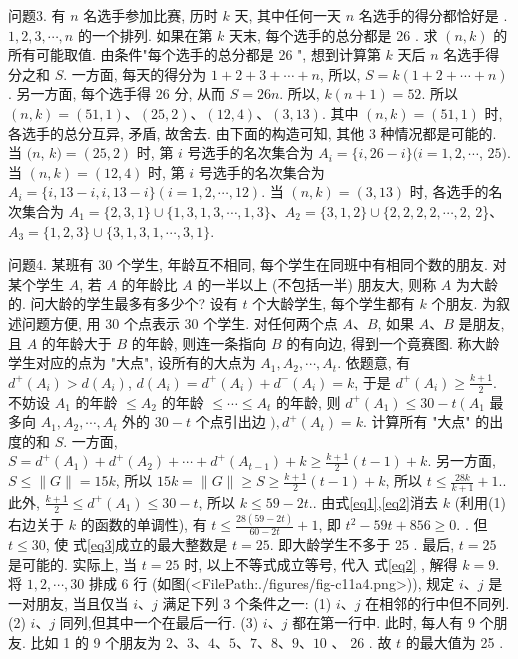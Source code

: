 问题3. 有 $n$ 名选手参加比赛, 历时 $k$ 天, 其中任何一天 $n$ 名选手的得分都恰好是 . $1,2,3, \cdots, n$ 的一个排列.
如果在第 $k$ 天末, 每个选手的总分都是 26 . 求 $(n, k)$ 的所有可能取值.
由条件"每个选手的总分都是 26 ", 想到计算第 $k$ 天后 $n$ 名选手得分之和 $S$. 一方面, 每天的得分为 $1+2+3+\cdots+n$, 所以, $S=k(1+2+\cdots+n)$. 另一方面, 每个选手得 26 分, 从而 $S=26 n$. 所以, $k(n+1)=52$. 所以 $(n, k)= (51,1) 、(25,2) 、(12,4) 、(3,13)$. 其中 $(n, k)=(51,1)$ 时, 各选手的总分互异, 矛盾, 故舍去.
由下面的构造可知, 其他 3 种情况都是可能的.
当 $(n$, $k)=(25,2)$ 时, 第 $i$ 号选手的名次集合为 $A_i=\{i, 26-i\}(i=1,2, \cdots$, $25)$. 当 $(n, k)=(12,4)$ 时, 第 $i$ 号选手的名次集合为 $A_i=\{i, 13-i, i, 13-i\}(i=1,2, \cdots, 12)$. 当 $(n, k)=(3,13)$ 时, 各选手的名次集合为 $A_1= \{2,3,1\} \cup\{1,3,1,3, \cdots, 1,3\} 、 A_2=\{3,1,2\} \cup\{2,2,2,2, \cdots, 2$, 2\}、 $A_3=\{1,2,3\} \cup\{3,1,3,1, \cdots, 3,1\}$.



问题4. 某班有 30 个学生, 年龄互不相同, 每个学生在同班中有相同个数的朋友.
对某个学生 $A$, 若 $A$ 的年龄比 $A$ 的一半以上 (不包括一半) 朋友大, 则称 $A$ 为大龄的.
问大龄的学生最多有多少个?
设有 $t$ 个大龄学生, 每个学生都有 $k$ 个朋友.
为叙述问题方便, 用 30 个点表示 30 个学生.
对任何两个点 $A 、 B$, 如果 $A 、 B$ 是朋友, 且 $A$ 的年龄大于 $B$ 的年龄, 则连一条指向 $B$ 的有向边, 得到一个竟赛图.
称大龄学生对应的点为 "大点", 设所有的大点为 $A_1, A_2, \cdots, A_t$. 依题意, 有 $d^{+}\left(A_i\right)>d\left(A_i\right)$, $d\left(A_i\right)=d^{+}\left(A_i\right)+d^{-}\left(A_i\right)=k$, 于是 $d^{+}\left(A_i\right) \geqslant \frac{k+1}{2}$. 
不妨设 $A_1$ 的年龄 $\leqslant A_2$ 的年龄 $\leqslant \cdots \leqslant A_t$ 的年龄, 则 $d^{+}\left(A_1\right) \leqslant 30-t\left(A_1\right.$ 最多向 $A_1, A_2, \cdots, A_t$ 外的 $30-t$ 个点引出边 $), d^{+}\left(A_t\right)=k$. 计算所有 "大点" 的出度的和 $S$. 
一方面, $S=d^{+}\left(A_1\right)+d^{+}\left(A_2\right)+\cdots+d^{+}\left(A_{t-1}\right)+k \geqslant \frac{k+1}{2}(t-1)+k$. 另一方面, $S \leqslant\|G\|=15 k$, 所以 $15 k=\|G\| \geqslant S \geqslant \frac{k+1}{2}(t-1)+k$, 所以 $t \leqslant \frac{28 k}{k+1}+1 . \label{eq1}$. 
此外, $\frac{k+1}{2} \leqslant d^{+}\left(A_1\right) \leqslant 30-t$, 所以 $k \leqslant 59-2 t . \label{eq2}$. 由式\ref{eq1},\ref{eq2}消去 $k$ (利用(1)右边关于 $k$ 的函数的单调性), 有 $t \leqslant \frac{28(59-2 t)}{60-2 t}+1$, 即 $t^2- 59 t+856 \geqslant 0 . \label{eq3}$ . 
但 $t \leqslant 30$, 使 式\ref{eq3}成立的最大整数是 $t=25$. 即大龄学生不多于 25 . 最后, $t=25$ 是可能的.
实际上, 当 $t=25$ 时, 以上不等式成立等号, 代入 式\ref{eq2} , 解得 $k=9$.
将 $1,2, \cdots, 30$ 排成 6 行 (如图(<FilePath:./figures/fig-c11a4.png>)),
规定 $i 、 j$ 是一对朋友, 当且仅当 $i 、 j$ 满足下列 3 个条件之一:
(1) $i 、 j$ 在相邻的行中但不同列.
(2) $i 、 j$ 同列,但其中一个在最后一行.
(3) $i 、 j$ 都在第一行中.
此时, 每人有 9 个朋友.
比如 1 的 9 个朋友为 $2 、 3 、 4 、 5 、 7 、 8 、 9 、 10$ 、 26 . 故 $t$ 的最大值为 25 .



